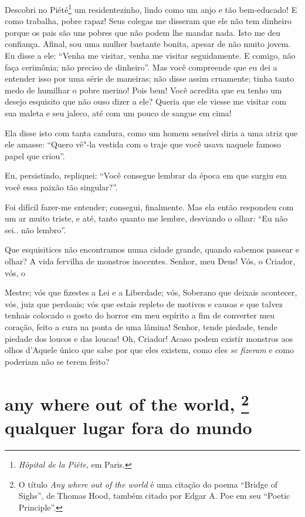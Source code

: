 \quebra

\noindent{}Descobri no
Piété\protect\footnote{  \textit{Hôpital de la Piéte}, em Paris.}
 um residentezinho, lindo como um anjo
e tão bem-educado! E como trabalha, pobre rapaz! Seus colegas me
disseram que ele não tem dinheiro porque os pais são uns pobres que
não podem lhe mandar nada. Isto me deu confiança. Afinal, sou uma
mulher bastante bonita, apesar de não muito jovem. Eu disse a ele:
“Venha me visitar, venha me visitar seguidamente. E
comigo, não faça cerimônia; não preciso de dinheiro''. Mas
você compreende que eu dei a entender isso por uma série de
maneiras; não disse assim cruamente; tinha tanto medo de
humilhar o pobre merino! Pois bem! Você acredita que eu tenho um
desejo esquisito que não ouso dizer a ele? Queria que ele viesse
me visitar com sua maleta e seu jaleco, até com um pouco de sangue em
cima!

Ela disse isto com tanta candura, como um homem sensível diria a
uma atriz que ele amasse: “Quero vê"-la vestida com o
traje que você usava naquele famoso papel que criou''.

Eu, persistindo, repliquei: “Você consegue lembrar da época
em que surgiu em você essa paixão tão singular?''.

Foi difícil fazer-me entender; consegui, finalmente. Mas ela então respondeu
com um ar muito triste, e até, tanto quanto me lembre, desviando o
olhar: “Eu não sei.. não lembro''.

Que esquisitices não encontramos numa cidade grande, quando sabemos
passear e olhar? A vida fervilha de monstros inocentes. Senhor, meu
Deus! Vós, o Criador, vós, o \linebreak

\quebra

\noindent{}Mestre; vós que fizestes a Lei e a
Liberdade; vós, Soberano que deixais acontecer, vós, juiz que perdoais;
vós que estais repleto de motivos e causas e que talvez tenhais
colocado o gosto do horror em meu espírito a fim de converter meu
coração, feito a cura na ponta de uma lâmina! Senhor, tende piedade,
tende piedade dos loucos e das loucas! Oh, Criador! Acaso podem existir
monstros aos olhos d’Aquele único que sabe por
que eles existem, como eles \textit{se fizeram} e como poderiam não se
terem feito?

\quebra\section[Any where out of the world, qualquer lugar fora do mundo]{any where out of the world,%
\protect\footnote{ O título \textit{Any where 
out of the world} é uma citação do poema
``Bridge of Sighs'', de Thomas Hood, também citado por Edgar A. Poe em seu ``Poetic Principle''.} 
qualquer lugar fora do mundo}

